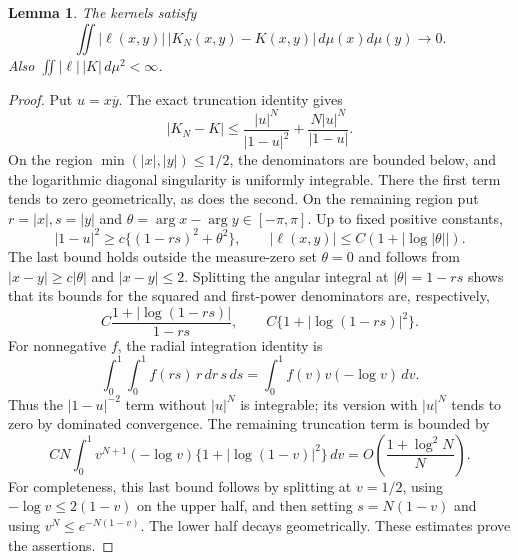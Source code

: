 \documentclass[11pt]{article}
\newtheorem{lemma}[theorem]{Lemma}
\theoremstyle{remark}\newtheorem{remark}[theorem]{Remark}
\begin{document}
\begin{lemma}\label{logkernel}
The kernels satisfy
\[
 \iint |\ell(x,y)|\,|K_N(x,y)-K(x,y)|\,d\mu(x)d\mu(y)\longrightarrow0.
\]
Also $\iint |\ell|\,|K|\,d\mu^2<\infty$.
\end{lemma}
\begin{proof}
Put $u=x\overline y$. The exact truncation identity gives
\[
 |K_N-K|\le\frac{|u|^N}{|1-u|^2}
                   +\frac{N|u|^N}{|1-u|}.
\]
On the region $\min(|x|,|y|)\le1/2$, the denominators are bounded below,
and the logarithmic diagonal singularity is uniformly integrable.
There the first term tends to zero geometrically, as does the second.
On the remaining region put $r=|x|,s=|y|$ and
$\theta=\arg x-\arg y\in[-\pi,\pi]$. Up to fixed positive constants,
\[
 |1-u|^2\ge c\{(1-rs)^2+\theta^2\},\qquad
 |\ell(x,y)|\le C(1+|\log|\theta||).
\]
The last bound holds outside the measure-zero set $\theta=0$ and follows
from $|x-y|\ge c|\theta|$ and $|x-y|\le2$. Splitting the angular integral
at $|\theta|=1-rs$ shows that its bounds for the squared and first-power
denominators are, respectively,
\[
 C\frac{1+|\log(1-rs)|}{1-rs},
 \qquad C\{1+|\log(1-rs)|^2\}.
\]
For nonnegative $f$, the radial integration identity is
\[
 \int_0^1\int_0^1 f(rs)\,r\,dr\,s\,ds
 =\int_0^1 f(v)v(-\log v)\,dv.
\]
Thus the $|1-u|^{-2}$ term without $|u|^N$ is integrable; its version with
$|u|^N$ tends to zero by dominated convergence. The remaining truncation
term is bounded by
\[
 CN\int_0^1 v^{N+1}(-\log v)
                 \{1+|\log(1-v)|^2\}\,dv
 =O\!\left(\frac{1+\log^2 N}{N}\right).
\]
For completeness, this last bound follows by splitting at $v=1/2$,
using $-\log v\le2(1-v)$ on the upper half, and then setting
$s=N(1-v)$ and using $v^N\le e^{-N(1-v)}$. The lower half decays
geometrically. These estimates prove the assertions.
\end{proof}
\end{document}

